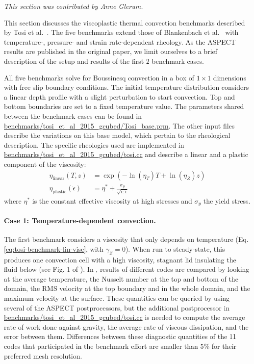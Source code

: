 \documentclass{article}
\newcommand{\aspect}{\textsc{ASPECT}}
\begin{document}
\textit{This section was contributed by Anne Glerum.}

This section discusses the viscoplastic thermal convection benchmarks described by Tosi et al.~\cite{T15}.  The five benchmarks extend those of Blankenbach et al.~\cite{BBC89} with temperature-, pressure- and strain rate-dependent rheology. As the \aspect{} results are published in the original paper, we limit ourselves to a brief description of the setup and results of the first 2 benchmark cases.

All five benchmarks solve for Boussinesq convection in a box of $1 \times 1$ dimensions with free slip boundary conditions. The initial temperature distribution considers a linear depth profile with a slight perturbation to start convection. Top and bottom boundaries are set to a fixed temperature value. The parameters shared between the benchmark cases can be found in \url{benchmarks/tosi_et_al_2015_gcubed/Tosi_base.prm}. The other input files describe the variations on this base model, which pertain to the rheological description. The specific rheologies used are implemented in \url{benchmarks/tosi_et_al_2015_gcubed/tosi.cc} and describe a linear and a plastic component of the viscosity:
\begin{align}
  \eta_\text{linear}(T,z) &= \exp(-\ln(\eta_T) T + \ln(\eta_Z) z)
  \label{eq:tosi-benchmark-lin-visc} \\
  \eta_\text{plastic}(\dot\epsilon) &= \eta^\ast + \frac{\sigma_y}{\sqrt{\dot\epsilon:\dot\epsilon}}
  \label{eq:tosi-benchmark-plast-visc}
\end{align}
where $\eta^\ast$ is the constant effective viscosity at high stresses and $\sigma_y$ the yield stress.

\paragraph{Case 1: Temperature-dependent convection.}
\label{sec:benchmark-tosi-case-1}

The first benchmark considers a viscosity that only depends on temperature (Eq. \eqref{eq:tosi-benchmark-lin-visc}, with $\gamma_Z=0$). When run to steady-state, this produces one convection cell with a high viscosity, stagnant lid insulating the fluid below (see Fig. 1 of \cite{T15}). In \cite{T15}, results of different codes are compared by looking at the average temperature, the Nusselt number at the top and bottom of the domain, the RMS velocity at the top boundary and in the whole domain, and the maximum velocity at the surface. These quantities can be queried by using several of the \aspect{} postprocessors, but the additional postprocessor in \url{benchmarks/tosi_et_al_2015_gcubed/tosi.cc} is needed to compute the average rate of work done against gravity, the average rate of viscous dissipation, and the error between them. Differences between these diagnostic quantities of the 11 codes that participated in the benchmark effort are smaller than 5\% for their preferred mesh resolution.
\end{document}

